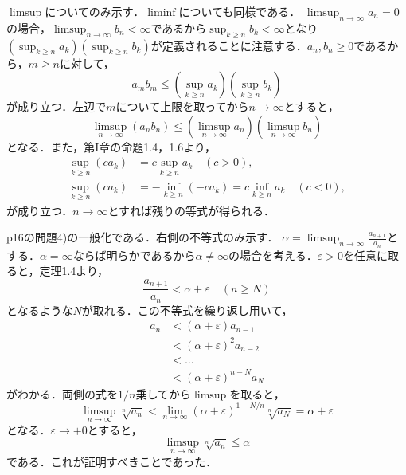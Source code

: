 
\begin{tproof}
    $\limsup$についてのみ示す．$\liminf$についても同様である．
    $\limsup_{n \to \infty} a_n = 0$の場合，$\limsup_{n \to \infty} b_n < \infty$であるから$\sup_{k \geq n} b_k < \infty$となり$\left(\sup _{k \geq n} a_k\right) \left(\sup _{k \geq n} b_k\right)$が定義されることに注意する．$a_n, b_n \geq 0$であるから，$m \geq n$に対して，
    \[
        a_m b_m \leq \left(\sup _{k \geq n} a_k\right) \left(\sup _{k \geq n} b_k\right)
    \]
    が成り立つ．左辺で$m$について上限を取ってから$n \to \infty$とすると，
    \[
        \limsup_{n \to \infty} (a_n b_n) \leq \left(\limsup _{n \to \infty} a_n\right) \left(\limsup_{n \to \infty} b_n\right)
    \]
    となる．また，第I章の命題1.4，1.6より，
    \begin{align*}
        \sup_{k \geq n} (c a_k) & = c\sup_{k \geq n} a_k \quad (c > 0),                             \\
        \sup_{k \geq n} (c a_k) & = -\inf_{k \geq n} (-c a_k) = c\inf_{k \geq n} a_k \quad (c < 0),
    \end{align*}
    が成り立つ．$n \to \infty$とすれば残りの等式が得られる．
\end{tproof}


\begin{tproof}
    p16の問題4)の一般化である．右側の不等式のみ示す．
    $\alpha = \limsup _{n \to \infty} \frac{a_{n+1}}{a_{n}}$とする．$\alpha = \infty$ならば明らかであるから$\alpha \neq \infty$の場合を考える．$\varepsilon > 0$を任意に取ると，定理1.4より，
    \[
        \frac{a_{n+1}}{a_{n}} < \alpha + \varepsilon \quad (n \geq N)
    \]
    となるような$N$が取れる．この不等式を繰り返し用いて，
    \begin{align*}
        a_n
         & < (\alpha + \varepsilon) a_{n-1}   \\
         & < (\alpha + \varepsilon)^2 a_{n-2} \\
         & < \ldots                           \\
         & < (\alpha + \varepsilon)^{n-N} a_N
    \end{align*}
    がわかる．両側の式を$1/n$乗してから$\limsup$を取ると，
    \[
        \limsup _{n \to \infty} \sqrt[n]{a_n} < \lim _{n \to \infty} (\alpha + \varepsilon)^{1-N/n} \sqrt[n]{a_N} = \alpha + \varepsilon
    \]
    となる．$\varepsilon \to +0$とすると，
    \[
        \limsup _{n \to \infty} \sqrt[n]{a_n} \leq \alpha
    \]
    である．これが証明すべきことであった．
\end{tproof}


